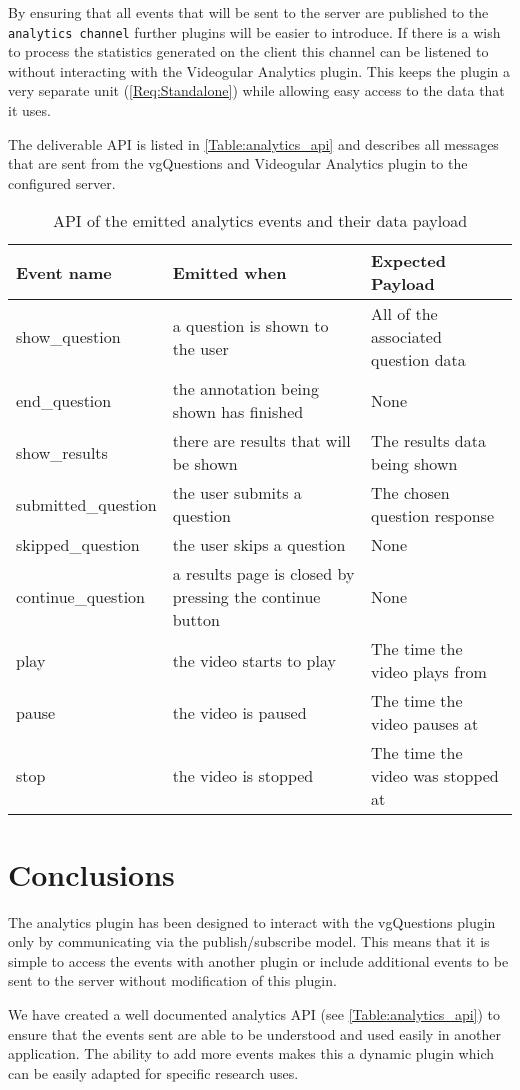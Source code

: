 By ensuring that all events that will be sent to the server are published to the \lstinline|analytics channel| further plugins will be easier to introduce. If there is a wish to process the statistics generated on the client this channel can be listened to without interacting with the \gls{Videogular} Analytics plugin. This keeps the plugin a very separate unit (\cref{Req:Standalone}) while allowing easy access to the data that it uses.

The deliverable \gls{API} is listed in \autoref{Table:analytics_api} and describes all messages that are sent from the \gls{vgQuestions} and  \gls{Videogular} Analytics plugin to the configured server.

\begin{table}[h]
\caption{\label{Table:analytics_api}API of the emitted analytics events and their data payload}
\begin{tabular}{p{3.2cm} p{6cm} p{4cm}}
\textbf{Event name} & \textbf{Emitted when} & \textbf{Expected Payload} \\
\hline
show\_question & a question is shown to the user & All of the associated question data \\
\hline
end\_question & the annotation being shown has finished & None \\
\hline
show\_results & there are results that will be shown & The results data being shown \\
\hline
submitted\_question & the user submits a question & The chosen question response \\
\hline
skipped\_question & the user skips a question & None \\
\hline
continue\_question & a results page is closed by pressing the continue button & None \\
\hline
play & the video starts to play & The time the video plays from \\
\hline
pause & the video is paused & The time the video pauses at \\
\hline
stop & the video is stopped & The time the video was stopped at \\
\end{tabular}
\end{table}

\section{Conclusions}

The analytics plugin has been designed to interact with the \gls{vgQuestions} plugin only by communicating via the publish/subscribe model. This means that it is simple to access the events with another plugin or include additional events to be sent to the server without modification of this plugin.

We have created a well documented analytics \gls{API} (see \autoref{Table:analytics_api}) to ensure that the events sent are able to be understood and used easily in another application. The ability to add more events makes this a dynamic plugin which can be easily adapted for specific research uses.